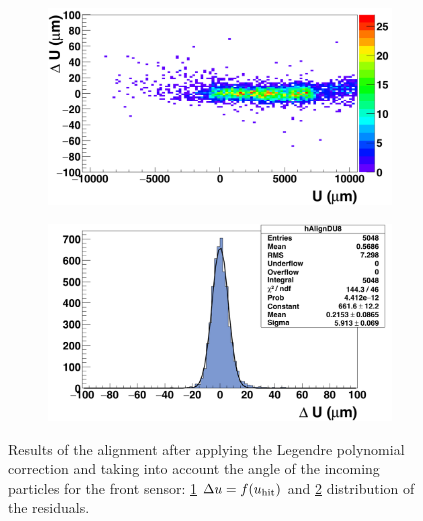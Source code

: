 \begin{figure}[!tbh]
        \begin{subfigure}[t]{0.45\textwidth}
          \centering
          \includegraphics[width = 1.2\textwidth]{Pictures/deformation/deltaUU_8_corrected1.png}
          \caption{}
          \label{fig:scatterDUU_corrected_front}
        \end{subfigure}
        \hfill
        \begin{subfigure}[t]{0.45\textwidth}
          \centering
          \includegraphics[width = 1.2\textwidth]{Pictures/deformation/deltaU_8_corrected1.png}
          \caption{}
          \label{fig:residualU_corrected}
        \end{subfigure}
        \caption{Results of the alignment after applying the Legendre polynomial correction and taking into account the angle of the incoming particles for the front sensor: \ref{fig:scatterDUU_corrected_front} $\Delta u=f(u_{\rm{hit}})$ and \ref{fig:residualU_corrected} distribution of the residuals.}
        \label{fig:alignmnetCorrected}

      \end{figure}

